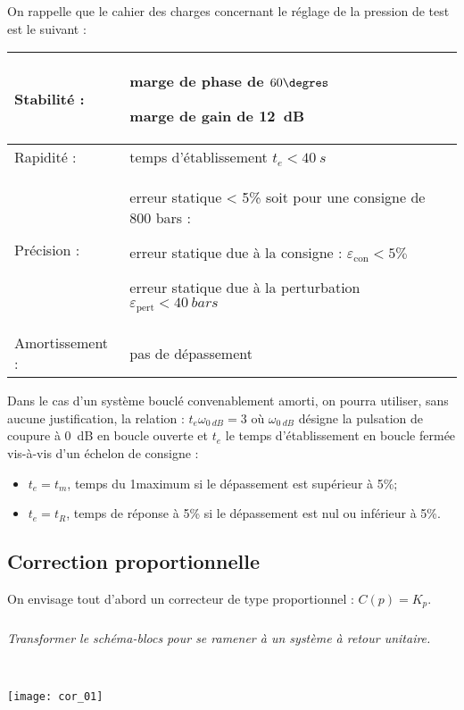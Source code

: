 \begin{multicols}{2}
On rappelle que le cahier des charges concernant le réglage de la pression de test est le suivant :
\begin{center}
\begin{tabular}{|l|p{5cm}|}
\hline
Stabilité : & marge de phase de $60\degres$

 marge de gain de \SI{12}{dB} \\ \hline
Rapidité :	&temps d’établissement $t_e < \SI{40}{s}$ \\ \hline
Précision :&	erreur statique < 5\% soit pour une consigne de 800 bars :

erreur statique due à la consigne : $\varepsilon_{\text{con}} < 5\%$ 

erreur statique due à la perturbation $\varepsilon_{\text{pert}} < \SI{40}{bars}$ \\ \hline

Amortissement :&	pas de dépassement \\ \hline
\end{tabular}
\end{center}

Dans le cas d’un système bouclé convenablement amorti, on pourra utiliser, sans aucune justification, la relation : 	$t_e \omega_{\SI{0}{dB}}=3$ 
où $\omega_{\SI{0}{dB}}$ désigne la pulsation de coupure à \SI{0}{dB} en boucle ouverte et $t_e$ le temps d’établissement en boucle fermée vis-à-vis d’un échelon de consigne :
\begin{itemize}
\item $t_e = t_m$, temps du 1\ier maximum si le dépassement est supérieur à 5\%;
\item $t_e = t_R$, temps de réponse à 5\% si le dépassement est nul ou inférieur à 5\%.
\end{itemize}
\fi

\subsection*{Correction proportionnelle}
On envisage tout d’abord un correcteur de type proportionnel : $C(p)=K_p$. 



\subparagraph{}
\textit{Transformer le schéma-blocs pour se ramener à un système à retour unitaire.}
\ifprof
\begin{corrige}~\\

\begin{center}
\texttt{[image: cor\_01]}
\end{center}
\end{corrige}
\else
\fi


\end{multicols}
